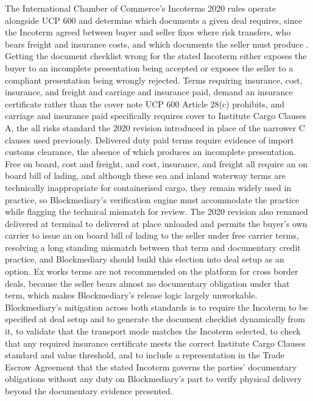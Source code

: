 \documentclass[12pt, a4paper]{article}
\begin{document}
The International Chamber of Commerce's Incoterms 2020 rules operate alongside UCP 600 and
determine which documents a given deal requires, since the Incoterm agreed between buyer
and seller fixes where risk transfers, who bears freight and insurance costs, and which
documents the seller must produce \citep{incoterms2020}. Getting the document checklist
wrong for the stated Incoterm either exposes the buyer to an incomplete presentation being
accepted or exposes the seller to a compliant presentation being wrongly rejected. Terms
requiring insurance, cost, insurance, and freight and carriage and insurance paid, demand
an insurance certificate rather than the cover note UCP 600 Article 28(c) prohibits, and
carriage and insurance paid specifically requires cover to Institute Cargo Clauses A, the
all risks standard the 2020 revision introduced in place of the narrower C clauses used
previously. Delivered duty paid terms require evidence of import customs clearance, the
absence of which produces an incomplete presentation. Free on board, cost and freight, and
cost, insurance, and freight all require an on board bill of lading, and although these
sea and inland waterway terms are technically inappropriate for containerised cargo, they
remain widely used in practice, so Blockmediary's verification engine must accommodate the
practice while flagging the technical mismatch for review. The 2020 revision also renamed
delivered at terminal to delivered at place unloaded and permits the buyer's own carrier to
issue an on board bill of lading to the seller under free carrier terms, resolving a long
standing mismatch between that term and documentary credit practice, and Blockmediary
should build this election into deal setup as an option. Ex works terms are not recommended
on the platform for cross border deals, because the seller bears almost no documentary
obligation under that term, which makes Blockmediary's release logic largely unworkable.
Blockmediary's mitigation across both standards is to require the Incoterm to be specified
at deal setup and to generate the document checklist dynamically from it, to validate that
the transport mode matches the Incoterm selected, to check that any required insurance
certificate meets the correct Institute Cargo Clauses standard and value threshold, and to
include a representation in the Trade Escrow Agreement that the stated Incoterm governs
the parties' documentary obligations without any duty on Blockmediary's part to verify
physical delivery beyond the documentary evidence presented.
\end{document}
